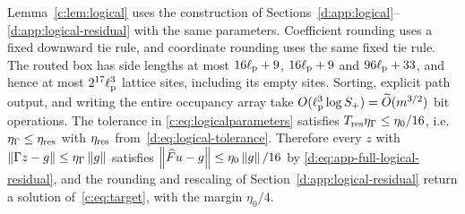 \begin{remark}
\label{si:rem:continuum-compiler}
Lemma~\ref{c:lem:logical} uses the construction of
Sections~\ref{d:app:logical}--\ref{d:app:logical-residual} with the same
parameters. Coefficient rounding uses a fixed downward tie rule, and
coordinate rounding uses the same fixed tie rule. The routed box has
side lengths at most $16\ell_{\rm p}+9$, $16\ell_{\rm p}+9$ and $96\ell_{\rm p}+33$, and hence at most
$2^{17}\ell_{\rm p}^3$ lattice sites, including its empty sites. Sorting, explicit
path output, and writing the entire occupancy array take
$O(\ell_{\rm p}^3\log S_+)=\widetilde O(m^{3/2})$ bit operations. The tolerance in
\eqref{c:eq:logicalparameters} satisfies
$T_{\rm res}\eta_\Gamma\le\eta_0/16$, i.e.\
$\eta_\Gamma\le\eta_{\rm res}$ with $\eta_{\rm res}$ from~\eqref{d:eq:logical-tolerance}.
Therefore every $z$ with $\left\lVert \Gamma z-g\right\rVert\le\eta_\Gamma\left\lVert g\right\rVert$
satisfies $\left\lVert \widehat Fu-g\right\rVert\le\eta_0\left\lVert g\right\rVert/16$ by
\eqref{d:eq:app-full-logical-residual}, and the rounding and rescaling
of Section~\ref{d:app:logical-residual} return a solution
of~\eqref{c:eq:target}, with the margin $\eta_0/4$.
\end{remark}
